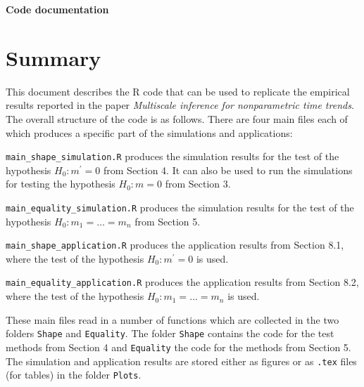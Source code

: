 \documentclass[a4paper,12pt]{article}
\begin{document}
\begin{center}
{\LARGE \bf Code documentation}
\end{center}
\vspace{0.5cm}



\section*{Summary}


\setlength{\parskip}{0.2cm} 
This document describes the R code that can be used to replicate the empirical results reported in the paper \textit{Multiscale inference for nonparametric time trends}. The overall structure of the code is as follows. There are four main files each of which produces a specific part of the simulations and applications:
\vspace{0.2cm}

\everypar{\hangafter=1\hangindent=1.45cm\relax}
\verb|main_shape_simulation.R| \hspace{1pt} produces the simulation results for the test of the hypothesis $H_0: m^\prime = 0$ from Section 4. It can also be used to run the simulations for testing the hypothesis $H_0: m = 0$ from Section $3$.

\verb|main_equality_simulation.R| \hspace{1pt} produces the simulation results for the test of the hypothesis $H_0: m_1 = \ldots = m_n$ from Section 5.

\verb|main_shape_application.R| \hspace{1pt} produces the application results from Section 8.1, where the test of the hypothesis $H_0: m^\prime = 0$ is used.

\verb|main_equality_application.R| \hspace{1pt} produces the application results from Section 8.2, where the test of the hypothesis $H_0: m_1 = \ldots = m_n$ is used. 
\vspace{0.2cm}

\everypar{\hangafter=0\relax}
These main files read in a number of functions which are collected in the two folders \verb|Shape| and \verb|Equality|. The folder \verb|Shape| contains the code for the test methods from Section 4 and \verb|Equality| the code for the methods from Section 5. The simulation and application results are stored either as figures or as \verb|.tex| files (for tables) in the folder \verb|Plots|. 
\vspace{0.2cm}
\end{document}
